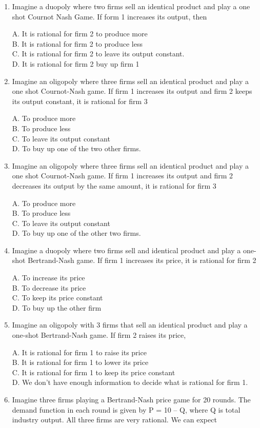 \documentclass[
]{book}
\begin{document}
\begin{enumerate}
\def\labelenumi{\arabic{enumi}.}
\item
  Imagine a duopoly where two firms sell an identical product and play a one shot Cournot Nash Game. If form 1 increases its output, then

  A. It is rational for firm 2 to produce more\\
  B. It is rational for firm 2 to produce less\\
  C. It is rational for firm 2 to leave its output constant.\\
  D. It is rational for firm 2 buy up firm 1
\item
  Imagine an oligopoly where three firms sell an identical product and play a one shot Cournot-Nash game. If firm 1 increases its output and firm 2 keeps its output constant, it is rational for firm 3

  A. To produce more\\
  B. To produce less\\
  C. To leave its output constant\\
  D. To buy up one of the two other firms.
\item
  Imagine an oligopoly where three firms sell an identical product and play a one shot Cournot-Nash game. If firm 1 increases its output and firm 2 decreases its output by the same amount, it is rational for firm 3

  A. To produce more\\
  B. To produce less\\
  C. To leave its output constant\\
  D. To buy up one of the other two firms.
\item
  Imagine a duopoly where two firms sell and identical product and play a one-shot Bertrand-Nash game. If firm 1 increases its price, it is rational for firm 2

  A. To increase its price\\
  B. To decrease its price\\
  C. To keep its price constant\\
  D. To buy up the other firm
\item
  Imagine an oligopoly with 3 firms that sell an identical product and play a one-shot Bertrand-Nash game. If firm 2 raises its price,

  A. It is rational for firm 1 to raise its price\\
  B. It is rational for firm 1 to lower its price\\
  C. It is rational for firm 1 to keep its price constant\\
  D. We don't have enough information to decide what is rational for firm 1.
\item
  Imagine three firms playing a Bertrand-Nash price game for 20 rounds. The demand function in each round is given by P = 10 -- Q, where Q is total industry output. All three firms are very rational. We can expect


\end{enumerate}
\end{document}
